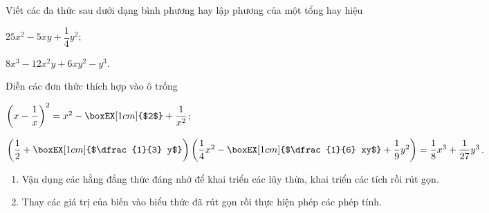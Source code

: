 \begin{vd}
	Viết các đa thức sau dưới dạng bình phương hay lập phương của một tổng hay hiệu
	\begin{listEX}[2]
		\item $25x^2 - 5xy + \dfrac{1}{4} y^2$;
		\item $8x^3 - 12x^2y + 6xy^2 - y^3$.
	\end{listEX} 
\end{vd}
\begin{vd}
	Điền các  đơn thức thích hợp vào ô trống
	\begin{listEX}
		\item $\left(x - \dfrac{1}{x}\right)^2 = x^2 - \boxEX[1cm]{$2$} + \dfrac{1}{x^2}$;
		\item $\left( \dfrac{1}{2} + \boxEX[1cm]{$\dfrac{1}{3} y$} \right)\left( \dfrac{1}{4}x^2 - \boxEX[1cm]{$\dfrac{1}{6} xy$} + \dfrac{1}{9} y^2\right) = \dfrac{1}{8} x^3 + \dfrac{1}{27} y^3$.
	\end{listEX}
\end{vd}
\begin{dang}
\begin{enumerate}[\tickEX]
	\item Vận dụng các hằng đẳng thức đáng nhớ để khai triển các lũy thừa, khai triển các tích rồi rút gọn.
	\item Thay các giá trị của biến vào biểu thức đã rút gọn rồi thực hiện phép các phép tính.
\end{enumerate}
\end{dang}
